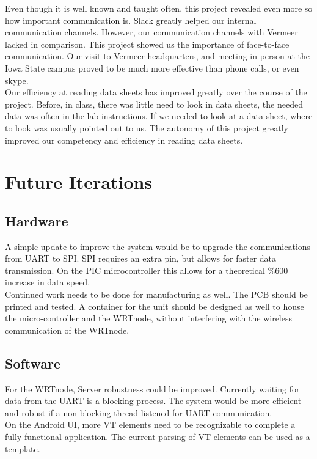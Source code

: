 \documentclass[paper=a4, fontsize=11pt]{scrartcl}
\numberwithin{equation}{section}		%
\numberwithin{figure}{section}			%
\numberwithin{table}{section}				%
\begin{document}
Even though it is well known and taught often, this project revealed even more so how important communication is. Slack greatly helped our internal communication channels. However, our communication channels with Vermeer lacked in comparison. This project showed us the importance of face-to-face communication. Our visit to Vermeer headquarters, and meeting in person at the Iowa State campus proved to be much more effective than phone calls, or even skype.\\

Our efficiency at reading data sheets has improved greatly over the course of the project. Before, in class, there was little need to look in data sheets, the needed data was often in the lab instructions. If we needed to look at a data sheet, where to look was usually pointed out to us. The autonomy of this project greatly improved our competency and efficiency in reading data sheets.\\

\pagebreak
\section{Future Iterations}
\subsection{Hardware}
A simple update to improve the system would be to upgrade the communications from UART to SPI. SPI requires an extra pin, but allows for faster data transmission. On the PIC microcontroller this allows for a theoretical \%600 increase in data speed. \\

Continued work needs to be done for manufacturing as well. The PCB should be printed and tested. A container for the unit should be designed as well to house the micro-controller and the WRTnode, without interfering with the wireless communication of the WRTnode. \\

\subsection{Software}
For the WRTnode, Server robustness could be improved. Currently waiting for data from the UART is a blocking process. The system would be more efficient and robust if a non-blocking thread listened for UART communication. \\

On the Android UI, more VT elements need to be recognizable to complete a fully functional application. The current parsing of VT elements can be used as a template.\\
\end{document}
